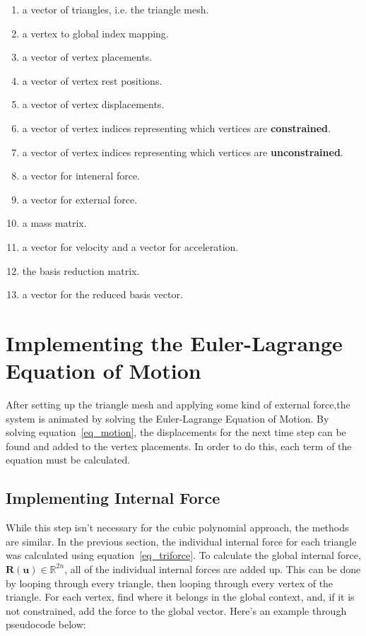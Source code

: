 \documentclass[twocolumn,10pt]{asme2ej}
\begin{document}
\begin{enumerate}
  \item a vector of triangles, i.e. the triangle mesh.
  \item a vertex to global index mapping.
  \item a vector of vertex placements.
  \item a vector of vertex rest positions.
  \item a vector of vertex displacements.
  \item a vector of vertex indices representing which vertices are \textbf{constrained}.
  \item a vector of vertex indices representing which vertices are \textbf{unconstrained}.
  \item a vector for inteneral force.
  \item a vector for external force.
  \item a mass matrix.
  \item a vector for velocity and a vector for acceleration.
  \item the basis reduction matrix.
  \item a vector for the reduced basis vector.
\end{enumerate}

\section{Implementing the Euler-Lagrange Equation of Motion}

After setting up the triangle mesh and applying some kind of external force,the system is animated by solving the Euler-Lagrange Equation of Motion. By solving equation~\ref{eq_motion}, the displacements for the next time step can be found and added to the vertex placements. In order to do this, each term of the equation must be calculated.

\subsection{Implementing Internal Force}

While this step isn't necessary for the cubic polynomial approach, the methods are similar. In the previous section, the individual internal force for each triangle was calculated using equation~\ref{eq_triforce}. To calculate the global internal force, $\bm{R}(\bm{u}) \in \mathbb{R}^{2n}$, all of the individual internal forces are added up. This can be done by looping through every triangle, then looping through every vertex of the triangle. For each vertex, find where it belongs in the global context, and, if it is not constrained, add the force to the global vector. Here's an example through pseudocode below:
\end{document}
